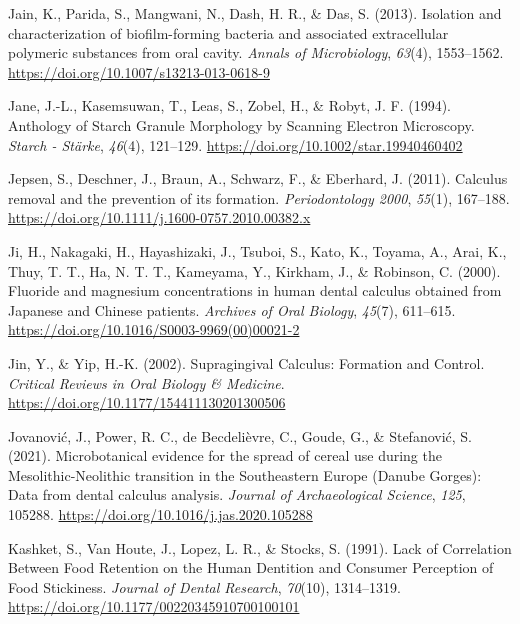\documentclass[
  letterpaper,
]{book}
\newlength{\cslhangindent}
\newlength{\cslentryspacingunit} %
\newenvironment{CSLReferences}[2] %
 {%
  \setlength{\parindent}{0pt}
  \ifodd #1
  \let\oldpar\par
  \def\par{\hangindent=\cslhangindent\oldpar}
  \fi
  \setlength{\parskip}{#2\cslentryspacingunit}
 }%
 {}
\begin{document}
\begin{CSLReferences}{1}{0}
\leavevmode{}%
Jain, K., Parida, S., Mangwani, N., Dash, H. R., \& Das, S. (2013).
Isolation and characterization of biofilm-forming bacteria and
associated extracellular polymeric substances from oral cavity.
\emph{Annals of Microbiology}, \emph{63}(4), 1553--1562.
\url{https://doi.org/10.1007/s13213-013-0618-9}

\leavevmode{}%
Jane, J.-L., Kasemsuwan, T., Leas, S., Zobel, H., \& Robyt, J. F.
(1994). Anthology of {Starch Granule Morphology} by {Scanning Electron
Microscopy}. \emph{Starch - Stärke}, \emph{46}(4), 121--129.
\url{https://doi.org/10.1002/star.19940460402}

\leavevmode{}%
Jepsen, S., Deschner, J., Braun, A., Schwarz, F., \& Eberhard, J.
(2011). Calculus removal and the prevention of its formation.
\emph{Periodontology 2000}, \emph{55}(1), 167--188.
\url{https://doi.org/10.1111/j.1600-0757.2010.00382.x}

\leavevmode{}%
Ji, H., Nakagaki, H., Hayashizaki, J., Tsuboi, S., Kato, K., Toyama, A.,
Arai, K., Thuy, T. T., Ha, N. T. T., Kameyama, Y., Kirkham, J., \&
Robinson, C. (2000). Fluoride and magnesium concentrations in human
dental calculus obtained from {Japanese} and {Chinese} patients.
\emph{Archives of Oral Biology}, \emph{45}(7), 611--615.
\url{https://doi.org/10.1016/S0003-9969(00)00021-2}

\leavevmode{}%
Jin, Y., \& Yip, H.-K. (2002). Supragingival {Calculus}: {Formation} and
{Control}. \emph{Critical Reviews in Oral Biology \& Medicine}.
\url{https://doi.org/10.1177/154411130201300506}

\leavevmode{}%
Jovanović, J., Power, R. C., de Becdelièvre, C., Goude, G., \&
Stefanović, S. (2021). Microbotanical evidence for the spread of cereal
use during the {Mesolithic-Neolithic} transition in the {Southeastern
Europe} ({Danube Gorges}): {Data} from dental calculus analysis.
\emph{Journal of Archaeological Science}, \emph{125}, 105288.
\url{https://doi.org/10.1016/j.jas.2020.105288}

\leavevmode{}%
Kashket, S., Van Houte, J., Lopez, L. R., \& Stocks, S. (1991). Lack of
{Correlation Between Food Retention} on the {Human Dentition} and
{Consumer Perception} of {Food Stickiness}. \emph{Journal of Dental
Research}, \emph{70}(10), 1314--1319.
\url{https://doi.org/10.1177/00220345910700100101}


\end{CSLReferences}
\end{document}
